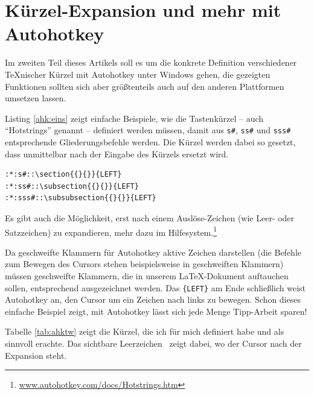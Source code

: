 \documentclass[ngerman]{dtk}%
\newcommand{\ahk}{Autohotkey\xspace}
\begin{document}
\section{Kürzel-Expansion und mehr mit \ahk}

Im zweiten Teil dieses Artikels soll es um die konkrete Definition verschiedener \TeX nischer Kürzel mit \ahk unter Windows gehen, die gezeigten Funktionen sollten sich aber größtenteils auch auf den anderen Plattformen umsetzen lassen.

Listing \ref{ahk:eins} zeigt einfache Beispiele, wie die Tastenkürzel -- auch \enquote{Hotstrings} genannt -- definiert werden müssen, damit aus \texttt{s\#}, \texttt{ss\#} und \texttt{sss\#} entsprechende Gliederungsbefehle werden. Die Kürzel werden dabei so gesetzt, dass unmittelbar nach der Eingabe des Kürzels ersetzt wird. 

\begin{lstlisting}[frame=single,caption={\textbackslash section-Expansionen},label={ahk:eins}]
:*:s#::\section{{}{}}{LEFT}
:*:ss#::\subsection{{}{}}{LEFT}
:*:sss#::\subsubsection{{}{}}{LEFT}
\end{lstlisting}

Es gibt auch die Möglichkeit, erst nach einem Auslöse-Zeichen (wie Leer- oder Satzzeichen) zu expandieren, mehr dazu im Hilfesystem.\footnote{\url{www.autohotkey.com/docs/Hotstrings.htm}}

Da geschweifte Klammern für Autohotkey aktive Zeichen darstellen (die Befehle zum Bewegen des Cursors stehen beispielsweise in geschweiften Klammern) müssen geschweifte Klammern, die in unserem \LaTeX-Dokument auftauchen sollen, entsprechend ausgezeichnet werden. Das \texttt{\{LEFT\}} am Ende schließlich weist \ahk an, den Cursor um ein Zeichen nach links zu bewegen. Schon dieses einfache Beispiel zeigt, mit \ahk lässt sich jede Menge Tipp-Arbeit sparen!

Tabelle \ref{tab:ahktw} zeigt die Kürzel, die ich für mich definiert habe und als sinnvoll erachte. Das sichtbare Leerzeichen \textvisiblespace\ zeigt dabei, wo der Cursor nach der Expansion steht.
\end{document}
